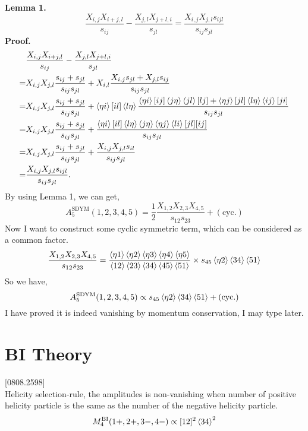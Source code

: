 \documentclass[a4paper,11pt]{article}
\newcommand{\Xij}[2]{\braket{\eta #1}[#1 #2]\braket{#2 \eta}}
\newcommand{\etal}[1]{\braket{\eta #1}}
\begin{document}
\textbf{Lemma 1.}
\begin{equation}
    \frac{X_{i,j}X_{i+j,l}}{s_{ij}}-\frac{X_{j,l}X_{j+l,i}}{s_{jl}}=\frac{X_{i,j}X_{j,l}s_{ijl}}{s_{ij}s_{jl}}
\end{equation}
\textbf{Proof.}
\begin{equation}
    \begin{split}
        &\frac{X_{i,j}X_{i+j,l}}{s_{ij}}-\frac{X_{j,l}X_{j+l,i}}{s_{jl}}\\
        =&X_{i,j}X_{j,l}\frac{s_{ij}+s_{jl}}{s_{ij}s_{jl}}+X_{i,l}\frac{X_{i,j}s_{jl}+X_{j,l}s_{ij}}{s_{ij}s_{jl}}\\
        =&X_{i,j}X_{j,l}\frac{s_{ij}+s_{jl}}{s_{ij}s_{jl}}
        +\Xij{i}{l}\frac{\Xij{i}{j}\braket{jl}[lj]+\Xij{j}{l}\braket{ij}[ji]}{s_{ij}s_{jl}}\\
        =&X_{i,j}X_{j,l}\frac{s_{ij}+s_{jl}}{s_{ij}s_{jl}}
        +\frac{\Xij{i}{l}\braket{j \eta}\braket{\eta j }\braket{li}[jl][ij]}{s_{ij}s_{jl}}\\
        =&X_{i,j}X_{j,l}\frac{s_{ij}+s_{jl}}{s_{ij}s_{jl}}
        +\frac{X_{i,j}X_{j,l}s_{il}}{s_{ij}s_{jl}}\\
        =&\frac{X_{i,j}X_{j,l}s_{ijl}}{s_{ij}s_{jl}}.
    \end{split}
\end{equation}
By using Lemma 1, we can get,
\begin{equation}
    A_5^{\text{SDYM}}(1,2,3,4,5)=\frac{1}{2}\frac{X_{1,2}X_{2,3}X_{4,5}}{s_{12}s_{23}}+(\text{cyc.})
\end{equation}
Now I want to construct some cyclic symmetric term, which can be considered as a common factor.
\begin{equation}
    \begin{split}
        \frac{X_{1,2}X_{2,3}X_{4,5}}{s_{12}s_{23}}=
        \frac{\etal{1}\etal{2}\etal{3}\etal{4}\etal{5}}{\braket{12}\braket{23}\braket{34}\braket{45}\braket{51}}
        \times{s_{45}\etal{2}\braket{34}\braket{51}} 
    \end{split}
\end{equation}
So we have,
\begin{equation}
    A_5^{\text{SDYM}}(1,2,3,4,5)\propto {s_{45}\etal{2}\braket{34}\braket{51}}+(\text{cyc.})
\end{equation}
{\color{red}I have proved it is indeed vanishing by momentum conservation, I may type later.}

\section{BI Theory}
[0808.2598]\\
Helicity selection-rule, the amplitudes is non-vanishing when number of positive helicity particle is the same as the number of the negative helicity particle. 
\begin{equation}
    M_4^{\text{BI}}(1+,2+,3-,4-)\propto [12]^2\braket{34}^2
\end{equation}
\end{document}
